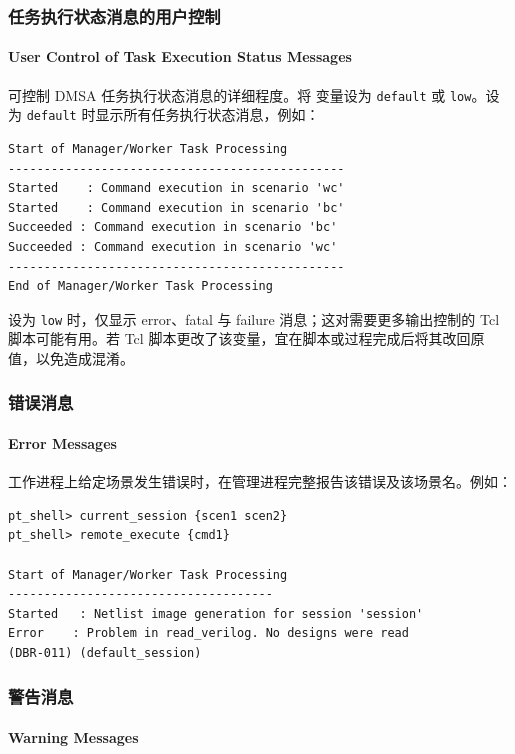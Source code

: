 \subsubsection{任务执行状态消息的用户控制}
\paragraph*{User Control of Task Execution Status Messages}

可控制 DMSA 任务执行状态消息的详细程度。将  变量设为 \texttt{default} 或 \texttt{low}。设为 \texttt{default} 时显示所有任务执行状态消息，例如：
\begin{lstlisting}
Start of Manager/Worker Task Processing
-----------------------------------------------
Started    : Command execution in scenario 'wc'
Started    : Command execution in scenario 'bc'
Succeeded : Command execution in scenario 'bc'
Succeeded : Command execution in scenario 'wc'
-----------------------------------------------
End of Manager/Worker Task Processing
\end{lstlisting}

设为 \texttt{low} 时，仅显示 error、fatal 与 failure 消息；这对需要更多输出控制的 Tcl 脚本可能有用。若 Tcl 脚本更改了该变量，宜在脚本或过程完成后将其改回原值，以免造成混淆。

\subsubsection{错误消息}
\paragraph*{Error Messages}

工作进程上给定场景发生错误时，在管理进程完整报告该错误及该场景名。例如：
\begin{lstlisting}
pt_shell> current_session {scen1 scen2}
pt_shell> remote_execute {cmd1}

Start of Manager/Worker Task Processing
-------------------------------------
Started   : Netlist image generation for session 'session'
Error    : Problem in read_verilog. No designs were read
(DBR-011) (default_session)
\end{lstlisting}

\subsubsection{警告消息}
\paragraph*{Warning Messages}

